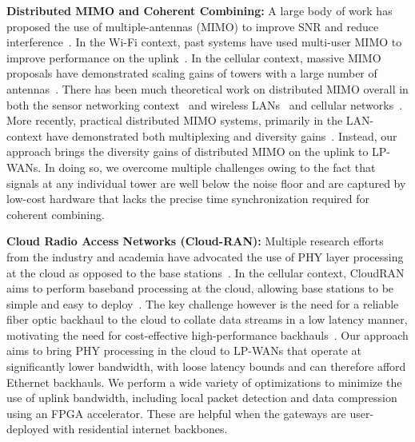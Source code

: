 \noindent \textbf{Distributed MIMO and Coherent Combining: } A large body of
work has proposed the use of multiple-antennas (MIMO) to improve SNR and
reduce interference~\cite{xie2014scalable, lin2011random, kumar2013bringing}.
In the Wi-Fi context, past systems have used multi-user MIMO to improve
performance on the uplink~\cite{shen2014rate, tan2009sam, xie2014scalable}. In
the cellular context, massive MIMO proposals have demonstrated scaling gains
of towers with a large number of antennas~\cite{shepard2012argos,
larsson2014massive}. There has been much theoretical work on distributed MIMO
overall in both the sensor networking context~\cite{del2007cooperative} and
wireless LANs~\cite{dohler2004resource} and cellular
networks~\cite{sawahashi2010coordinated}.  More recently, practical
distributed MIMO systems, primarily in the LAN-context have demonstrated both
multiplexing and diversity gains~\cite{hamed2016real, yenamandra2014vidyut,
rahul2012jmb}. Instead, our approach brings the diversity gains of distributed
MIMO on the uplink to LP-WANs. In doing so, we overcome multiple challenges
owing to the fact that signals at any individual tower are well below the
noise floor and are captured by low-cost hardware that lacks the precise time
synchronization required for coherent combining.

\noindent \textbf{Cloud Radio Access Networks (Cloud-RAN): } Multiple research
efforts from the industry and academia have advocated the use of PHY layer
processing at the cloud as opposed to the base stations~\cite{sabella2013ran,
hadzialic2013cloud}. In the cellular context, CloudRAN aims to perform
baseband processing at the cloud, allowing base stations to be simple and easy
to deploy~\cite{checko2015cloud, wubben2014benefits}. The key challenge
however is the need for a reliable fiber optic backhaul to the cloud to
collate data streams in a low latency manner, motivating the need for
cost-effective high-performance backhauls~\cite{liu2013case, chih2014recent}.
Our approach aims to bring PHY processing in the cloud to LP-WANs that operate
at significantly lower bandwidth, with loose latency bounds and can therefore
afford Ethernet backhauls. We perform a wide variety of optimizations to
minimize the use of uplink bandwidth, including local packet detection and
data compression using an FPGA accelerator. These are helpful when the
gateways are user-deployed with residential internet backbones.